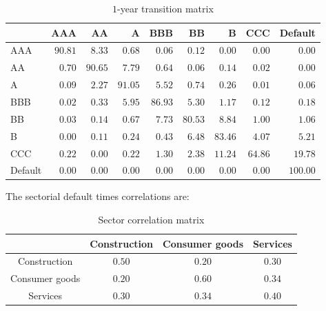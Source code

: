 \documentclass[a4paper,12pt,final]{article}
\begin{document}
\begin{table}[!hb]
\begin{center}
\begin{tabular}[]{l|rrrrrrrr}
        &      AAA &       AA &        A &      BBB &       BB &        B &      CCC &  Default \\
\hline
AAA     &  $90.81$ &   $8.33$ &   $0.68$ &   $0.06$ &   $0.12$ &   $0.00$ &   $0.00$ &   $0.00$ \\
 AA     &   $0.70$ &  $90.65$ &   $7.79$ &   $0.64$ &   $0.06$ &   $0.14$ &   $0.02$ &   $0.00$ \\
  A     &   $0.09$ &   $2.27$ &  $91.05$ &   $5.52$ &   $0.74$ &   $0.26$ &   $0.01$ &   $0.06$ \\
BBB     &   $0.02$ &   $0.33$ &   $5.95$ &  $86.93$ &   $5.30$ &   $1.17$ &   $0.12$ &   $0.18$ \\
 BB     &   $0.03$ &   $0.14$ &   $0.67$ &   $7.73$ &  $80.53$ &   $8.84$ &   $1.00$ &   $1.06$ \\
  B     &   $0.00$ &   $0.11$ &   $0.24$ &   $0.43$ &   $6.48$ &  $83.46$ &   $4.07$ &   $5.21$ \\
CCC     &   $0.22$ &   $0.00$ &   $0.22$ &   $1.30$ &   $2.38$ &  $11.24$ &  $64.86$ &  $19.78$ \\
Default &   $0.00$ &   $0.00$ &   $0.00$ &   $0.00$ &   $0.00$ &   $0.00$ &   $0.00$ & $100.00$ \\
\end{tabular}
\caption{$1$-year transition matrix}
\label{example.tmatrix}
\end{center}
\end{table}

The sectorial default times correlations are:

\begin{table}[!hb]
\begin{center}
\begin{tabular}[]{c|ccc}
               & Construction & Consumer goods & Services \\
\hline
Construction   &    $0.50$    &     $0.20$     &   $0.30$ \\
Consumer goods &    $0.20$    &     $0.60$     &   $0.34$ \\
Services       &    $0.30$    &     $0.34$     &   $0.40$ \\
\end{tabular}
\caption{Sector correlation matrix}
\label{example.scorrels}
\end{center}
\end{table}
\end{document}
